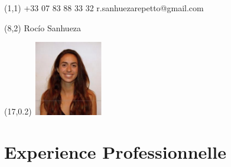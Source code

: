 \documentclass{tccv}
\begin{document}

\begin{textblock}{6.5}(1,1)
    {+33 07 83 88 33 32}
    {r.sanhuezarepetto@gmail.com}
\end{textblock}

\begin{textblock}{5}(8,2)
     Roc\'io Sanhueza
\end{textblock}

\begin{textblock}{21}(17,0.2)
		\includegraphics[width=3cm]{../Figure/Rocio1.png}
\end{textblock}  


\vspace*{3cm}


\section{Experience Professionnelle}


     
\end{document}
